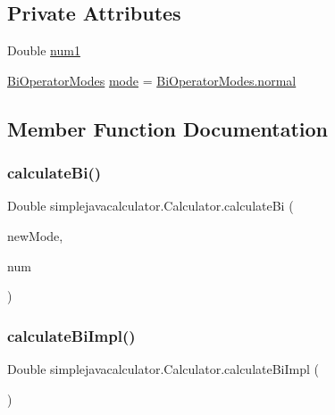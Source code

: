 \subsection*{Private Attributes}
\begin{DoxyCompactItemize}
\item 
Double \mbox{\hyperlink{classsimplejavacalculator_1_1_calculator_aa709e89fa67612cdd45eed743caa7523}{num1}}
\item 
\mbox{\hyperlink{enumsimplejavacalculator_1_1_calculator_1_1_bi_operator_modes}{Bi\+Operator\+Modes}} \mbox{\hyperlink{classsimplejavacalculator_1_1_calculator_af05f6e5dcee50285e3f758178b800c77}{mode}} = \mbox{\hyperlink{enumsimplejavacalculator_1_1_calculator_1_1_bi_operator_modes_a56133d3ae106bb392daf0ef835b6068a}{Bi\+Operator\+Modes.\+normal}}
\end{DoxyCompactItemize}


\subsection{Member Function Documentation}
\mbox{\label{classsimplejavacalculator_1_1_calculator_a3fc8bb3efd14ca75851e4b37ce95ed54}} 
\subsubsection{\texorpdfstring{calculateBi()}{calculateBi()}}
{\footnotesize\ttfamily Double simplejavacalculator.\+Calculator.\+calculate\+Bi (\begin{DoxyParamCaption}\item[{\mbox{\hyperlink{enumsimplejavacalculator_1_1_calculator_1_1_bi_operator_modes}{Bi\+Operator\+Modes}}}]{new\+Mode,  }\item[{Double}]{num }\end{DoxyParamCaption})}

\mbox{\label{classsimplejavacalculator_1_1_calculator_a3a95a22b6cfe0b22a1c723452d70894f}} 
\subsubsection{\texorpdfstring{calculateBiImpl()}{calculateBiImpl()}}
{\footnotesize\ttfamily Double simplejavacalculator.\+Calculator.\+calculate\+Bi\+Impl (\begin{DoxyParamCaption}{ }\end{DoxyParamCaption})\hspace{0.3cm}{\ttfamily [private]}}

